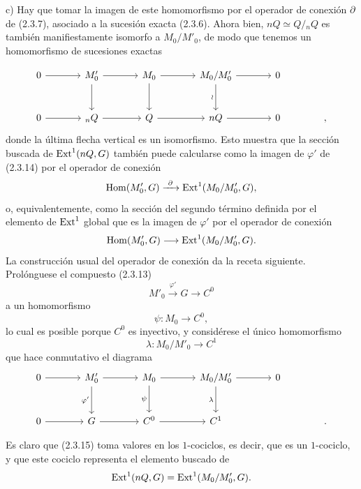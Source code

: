 \par\medskip
\noindent c) Hay que tomar la imagen de este homomorfismo por el
operador de conexión $\partial$ de (2.3.7), asociado a la sucesión
exacta (2.3.6). Ahora bien,
$nQ\simeq Q/{}_nQ$ es también manifiestamente isomorfo a $M_0/M'_0$,
de modo que tenemos un homomorfismo de sucesiones exactas


\[
\begin{tikzcd}[column sep=large,row sep=large]
 0\arrow[r]&M'_0\arrow[r]\arrow[d]&M_0\arrow[r]\arrow[d]
   &M_0/M'_0\arrow[r]\arrow[d,"\wr"']&0\\
 0\arrow[r]&{}_nQ\arrow[r]&Q\arrow[r]&nQ\arrow[r]&0&{,}
\end{tikzcd}
\]
donde la última flecha vertical es un isomorfismo. Esto muestra que la
sección buscada de $\operatorname{Ext}^1(nQ,G)$ también puede calcularse como la
imagen de $\varphi'$ de (2.3.14) por el operador de conexión
\[
 \operatorname{Hom}(M'_0,G)\xrightarrow{\ \partial\ }
 \operatorname{Ext}^1(M_0/M'_0,G),
\]
o, equivalentemente, como la sección del segundo término definida por
el elemento de $\operatorname{Ext}^1$ global que es la imagen de $\varphi'$ por el
operador de conexión
\[
 \operatorname{Hom}(M'_0,G)\longrightarrow
 \operatorname{Ext}^1(M_0/M'_0,G).
\]
La construcción usual del operador de conexión da la receta siguiente.
Prolónguese el compuesto (2.3.13)
\[
 M'_0\xrightarrow{\ \varphi'\ }G\longrightarrow C^0
\]
a un homomorfismo
\[
 \psi:M_0\longrightarrow C^0,
\]
lo cual es posible porque $C^0$ es inyectivo, y considérese el único
homomorfismo
\begin{equation}\tag{2.3.15}
 \lambda:M_0/M'_0\longrightarrow C^1
\end{equation}
que hace conmutativo el diagrama
\[
\begin{tikzcd}[column sep=large,row sep=large]
 0\arrow[r]&M'_0\arrow[r]\arrow[d,"\varphi'"']
   &M_0\arrow[r]\arrow[d,"\psi"']
   &M_0/M'_0\arrow[r]\arrow[d,"\lambda"']&0\\
 0\arrow[r]&G\arrow[r]&C^0\arrow[r]&C^1&&{.}
\end{tikzcd}
\]


Es claro que (2.3.15) toma valores en los $1$-cociclos, es decir, que
es un $1$-cociclo, y que este cociclo representa el elemento buscado de
\[
 \operatorname{Ext}^1(nQ,G)=\operatorname{Ext}^1(M_0/M'_0,G).
\]

